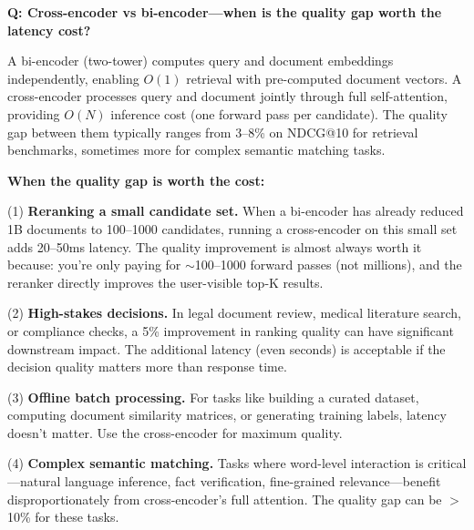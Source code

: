 \begin{interviewq}
\end{interviewq}


\begin{interviewq}
\textbf{Q: Cross-encoder vs bi-encoder---when is the quality gap worth the latency cost?}

 \quad {} \quad \badgefreq{\freqhigh}

\stronganswer

A bi-encoder (two-tower) computes query and document embeddings independently, enabling $O(1)$ retrieval with pre-computed document vectors. A cross-encoder processes query and document jointly through full self-attention, providing $O(N)$ inference cost (one forward pass per candidate). The quality gap between them typically ranges from 3--8\% on NDCG@10 for retrieval benchmarks, sometimes more for complex semantic matching tasks.

\textbf{When the quality gap is worth the cost:}

(1) \textbf{Reranking a small candidate set.} When a bi-encoder has already reduced 1B documents to 100--1000 candidates, running a cross-encoder on this small set adds 20--50ms latency. The quality improvement is almost always worth it because: you're only paying for $\sim$100--1000 forward passes (not millions), and the reranker directly improves the user-visible top-K results.

(2) \textbf{High-stakes decisions.} In legal document review, medical literature search, or compliance checks, a 5\% improvement in ranking quality can have significant downstream impact. The additional latency (even seconds) is acceptable if the decision quality matters more than response time.

(3) \textbf{Offline batch processing.} For tasks like building a curated dataset, computing document similarity matrices, or generating training labels, latency doesn't matter. Use the cross-encoder for maximum quality.

(4) \textbf{Complex semantic matching.} Tasks where word-level interaction is critical---natural language inference, fact verification, fine-grained relevance---benefit disproportionately from cross-encoder's full attention. The quality gap can be $>$10\% for these tasks.


\end{interviewq}
